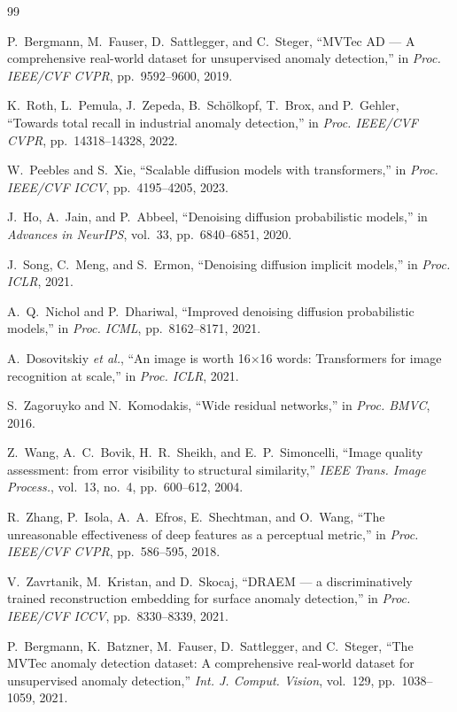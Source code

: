 \documentclass[11pt,letterpaper]{article}
\begin{document}
\begin{thebibliography}{99}

P.~Bergmann, M.~Fauser, D.~Sattlegger, and C.~Steger,
``MVTec AD --- A comprehensive real-world dataset for unsupervised anomaly detection,''
in \textit{Proc. IEEE/CVF CVPR}, pp.~9592--9600, 2019.

K.~Roth, L.~Pemula, J.~Zepeda, B.~Sch\"{o}lkopf, T.~Brox, and P.~Gehler,
``Towards total recall in industrial anomaly detection,''
in \textit{Proc. IEEE/CVF CVPR}, pp.~14318--14328, 2022.

W.~Peebles and S.~Xie,
``Scalable diffusion models with transformers,''
in \textit{Proc. IEEE/CVF ICCV}, pp.~4195--4205, 2023.

J.~Ho, A.~Jain, and P.~Abbeel,
``Denoising diffusion probabilistic models,''
in \textit{Advances in NeurIPS}, vol.~33, pp.~6840--6851, 2020.

J.~Song, C.~Meng, and S.~Ermon,
``Denoising diffusion implicit models,''
in \textit{Proc. ICLR}, 2021.

A.~Q.~Nichol and P.~Dhariwal,
``Improved denoising diffusion probabilistic models,''
in \textit{Proc. ICML}, pp.~8162--8171, 2021.

A.~Dosovitskiy \textit{et al.},
``An image is worth 16$\times$16 words: Transformers for image recognition at scale,''
in \textit{Proc. ICLR}, 2021.

S.~Zagoruyko and N.~Komodakis,
``Wide residual networks,''
in \textit{Proc. BMVC}, 2016.

Z.~Wang, A.~C.~Bovik, H.~R.~Sheikh, and E.~P.~Simoncelli,
``Image quality assessment: from error visibility to structural similarity,''
\textit{IEEE Trans. Image Process.}, vol.~13, no.~4, pp.~600--612, 2004.

R.~Zhang, P.~Isola, A.~A.~Efros, E.~Shechtman, and O.~Wang,
``The unreasonable effectiveness of deep features as a perceptual metric,''
in \textit{Proc. IEEE/CVF CVPR}, pp.~586--595, 2018.

V.~Zavrtanik, M.~Kristan, and D.~Skocaj,
``DRAEM --- a discriminatively trained reconstruction embedding for surface anomaly detection,''
in \textit{Proc. IEEE/CVF ICCV}, pp.~8330--8339, 2021.

P.~Bergmann, K.~Batzner, M.~Fauser, D.~Sattlegger, and C.~Steger,
``The MVTec anomaly detection dataset: A comprehensive real-world dataset for unsupervised anomaly detection,''
\textit{Int. J. Comput. Vision}, vol.~129, pp.~1038--1059, 2021.

\end{thebibliography}
\end{document}
